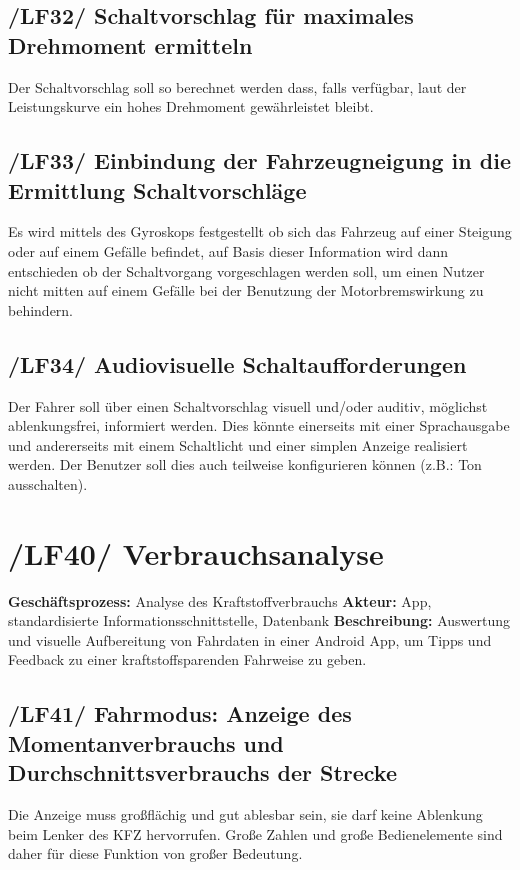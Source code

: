 \subsection{/LF32/ Schaltvorschlag für maximales Drehmoment ermitteln}
\nextline
Der Schaltvorschlag soll so berechnet werden dass, falls verfügbar, laut der Leistungskurve ein hohes Drehmoment gewährleistet bleibt. 

\subsection{/LF33/ Einbindung der Fahrzeugneigung in die Ermittlung Schaltvorschläge }
\nextline
Es wird mittels des Gyroskops festgestellt ob sich das Fahrzeug auf einer Steigung oder auf einem Gefälle befindet, auf Basis dieser Information wird dann entschieden ob der Schaltvorgang vorgeschlagen werden soll, um einen Nutzer nicht mitten auf einem Gefälle bei der Benutzung der Motorbremswirkung zu behindern.

\subsection{/LF34/ Audiovisuelle Schaltaufforderungen}
\nextline
Der Fahrer soll über einen Schaltvorschlag visuell und/oder auditiv, möglichst ablenkungsfrei, informiert werden. Dies könnte einerseits mit einer Sprachausgabe und andererseits mit einem Schaltlicht und einer simplen Anzeige realisiert werden. Der Benutzer soll dies auch teilweise konfigurieren können (z.B.: Ton ausschalten).

\newpage
\section{/LF40/ Verbrauchsanalyse}
\textbf{Geschäftsprozess:}	Analyse des Kraftstoffverbrauchs
\textbf{Akteur:}			App, standardisierte Informationsschnittstelle, Datenbank
\textbf{Beschreibung:}	Auswertung und visuelle Aufbereitung von Fahrdaten in einer Android App, um Tipps und Feedback zu einer kraftstoffsparenden Fahrweise zu geben.

\subsection{/LF41/ Fahrmodus: Anzeige des Momentanverbrauchs und Durchschnittsverbrauchs der Strecke}
\nextline
Die Anzeige muss großflächig und gut ablesbar sein, sie darf keine Ablenkung beim Lenker des KFZ hervorrufen. 
Große Zahlen und große Bedienelemente sind daher für diese Funktion von großer Bedeutung.

